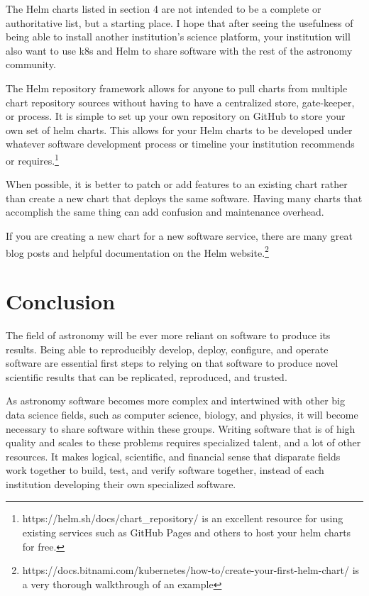 \documentclass[11pt,twoside]{article}
\begin{document}
The Helm charts listed in section 4 are not intended to be a complete or authoritative
list, but a starting place.  I hope that after seeing the usefulness of being able
to install another institution's science platform, your institution will also want to
use k8s and Helm to share software with the rest of the astronomy community.

The Helm repository framework allows for anyone to pull charts from multiple chart 
repository sources without having to have a centralized store, gate-keeper, or process.  It is
simple to set up your own repository on GitHub to store your own set of helm charts.
This allows for your Helm charts to be developed under whatever software development 
process or timeline your institution recommends or requires.\footnote{
https://helm.sh/docs/chart\_repository/ is an excellent resource for using existing
services such as GitHub Pages and others to host your helm charts for free.}

When possible, it is better to patch or add features to an existing chart rather
than create a new chart that deploys the same software.  Having many charts that
accomplish the same thing can add confusion and maintenance overhead.

If you are creating a new chart for a new software service, there are many great
blog posts and helpful documentation on the Helm website.\footnote{
https://docs.bitnami.com/kubernetes/how-to/create-your-first-helm-chart/
is a very thorough walkthrough of an example}

\section{Conclusion}

The field of astronomy will be ever more reliant on software to produce its results.
Being able to reproducibly develop, deploy, configure, and operate software are
essential first steps to relying on that software to produce novel scientific
results that can be replicated, reproduced, and trusted.

As astronomy software becomes more complex and intertwined with other big
data science fields, such as computer science, biology, and physics, it will
become necessary to share software within these groups.  Writing software that
is of high quality and scales to these problems requires specialized talent,
and a lot of other resources.  It makes logical, scientific, and financial
sense that disparate fields work together to build, test, and verify software
together, instead of each institution developing their own specialized software.
\end{document}
